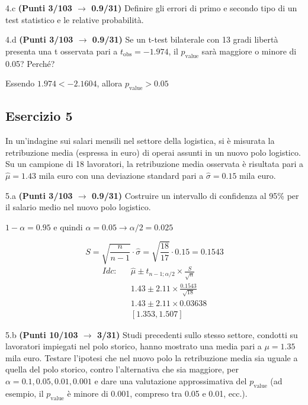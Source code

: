\documentclass[
  11pt,
]{book}
\theoremstyle{mytheoremstyle}
\theoremstyle{mydefstyle}
\newenvironment{sol}
  {
  \begin{tcolorbox}[enhanced,breakable,arc=0.1mm,boxrule=1pt,colback=white,colframe=iblue,
  title=\bf \fontfamily{lmss}\selectfont \hspace{.5 cm} Soluzione,drop fuzzy shadow]

}{
\end{tcolorbox}
  }
\begin{document}
4.c \textbf{(Punti 3/103 \(\rightarrow\) 0.9/31)} Definire gli errori di primo e secondo tipo di un test statistico e le relative probabilità.

4.d \textbf{(Punti 3/103 \(\rightarrow\) 0.9/31)} Se un t-test bilaterale con 13 gradi libertà presenta una
t osservata pari a \(t_\text{obs}=-1.974\), il \(p_\text{value}\) sarà maggiore o minore di 0.05? Perché?

\begin{sol}
Essendo \(1.974< -2.1604\), allora
\(p_\text{value}>0.05\)

\end{sol}

\subsection{Esercizio 5}\label{esercizio-5-47}

In un'indagine sui salari mensili nel settore della logistica, si è misurata la retribuzione media (espressa in euro) di operai assunti in un nuovo polo logistico. Su un campione di 18 lavoratori, la retribuzione media osservata è risultata pari a \(\hat\mu = 1.43\) mila euro con una deviazione standard pari a \(\hat\sigma = 0.15\) mila euro.

5.a \textbf{(Punti 3/103 \(\rightarrow\) 0.9/31)} Costruire un intervallo di confidenza al 95\% per il salario medio nel nuovo polo logistico.

\begin{sol}
\(1-\alpha =0.95\) e quindi \(\alpha=0.05\rightarrow \alpha/2=0.025\)

\[
      S  =\sqrt{\frac {n}{n-1}}\cdot\hat\sigma =
     \sqrt{\frac { 18 }{ 17 }}\cdot 0.15 = 0.1543 
\]
\begin{eqnarray*}
  Idc: & &  \hat\mu \pm  t_{n-1;\alpha/2} \times \frac{S}{\sqrt{n}} \\
     & &  1.43 \pm  2.11 \times \frac{ 0.1543 }{\sqrt{ 18 }} \\
     & &  1.43 \pm  2.11 \times  0.03638 \\
     & & [ 1.353 ,  1.507 ]
\end{eqnarray*}

\end{sol}

5.b \textbf{(Punti 10/103 \(\rightarrow\) 3/31)} Studi precedenti sullo stesso settore, condotti su lavoratori impiegati nel polo storico, hanno mostrato una media pari a \(\mu = 1.35\) mila euro. Testare l'ipotesi che nel nuovo polo la retribuzione media sia uguale a quella del polo storico, contro l'alternativa che sia maggiore, per \(\alpha = 0.1, 0.05, 0.01, 0.001\) e dare una valutazione approssimativa del \(p_{\text{value}}\) (ad esempio, il \(p_{\text{value}}\) è minore di 0.001, compreso tra 0.05 e 0.01, ecc.).
\end{document}
